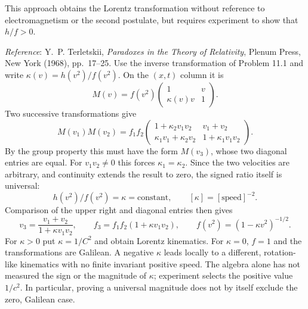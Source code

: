 This approach obtains the Lorentz transformation without reference to electromagnetism or the second postulate, but requires experiment to show that $h/f>0$.

\emph{Reference}: Y.~P. Terletskii, \emph{Paradoxes in the Theory of Relativity}, Plenum Press, New York (1968), pp.~17--25.
\solution
Use the inverse transformation of Problem 11.1 and write
$\kappa(v)=h(v^2)/f(v^2)$. On the $(x,t)$ column it is
\[
M(v)=f(v^2)\begin{pmatrix}1&v\\\kappa(v)v&1\end{pmatrix}.
\]
Two successive transformations give
\[
M(v_1)M(v_2)=f_1f_2
\begin{pmatrix}
1+\kappa_2v_1v_2&v_1+v_2\\
\kappa_1v_1+\kappa_2v_2&1+\kappa_1v_1v_2
\end{pmatrix}.
\]
By the group property this must have the form $M(v_3)$, whose
two diagonal entries are equal. For $v_1v_2\ne0$ this forces
$\kappa_1=\kappa_2$. Since the two velocities are arbitrary, and
continuity extends the result to zero, the signed ratio itself is
universal:
\[
\boxed{h(v^2)/f(v^2)=\kappa=\text{constant},\qquad
[\kappa]=[\text{speed}]^{-2}.}
\]
Comparison of the upper right and diagonal entries then gives
\[
v_3=\frac{v_1+v_2}{1+\kappa v_1v_2},\qquad
f_3=f_1f_2(1+\kappa v_1v_2),\qquad
f(v^2)=(1-\kappa v^2)^{-1/2}.
\]
For $\kappa>0$ put $\kappa=1/C^2$ and obtain Lorentz kinematics.
For $\kappa=0$, $f=1$ and the transformations are Galilean.
A negative $\kappa$ leads locally to a different, rotation-like
kinematics with no finite invariant positive speed. The algebra
alone has not measured the sign or the magnitude of $\kappa$;
experiment selects the positive value $1/c^2$. In particular,
proving a universal magnitude does not by itself exclude the
zero, Galilean case.

